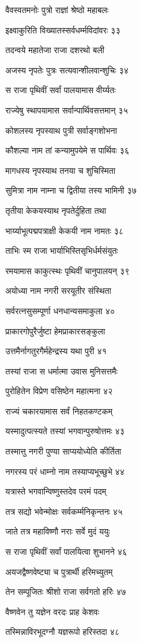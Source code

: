 वैवस्वतमनोः पुत्रो राज्ञां श्रेष्ठो महाबलः

इक्ष्वाकुरिति विख्यातस्सर्वधर्म्मविदांवरः ३३

तदन्वये महातेजा राजा दशरथो बली

अजस्य नृपतेः पुत्रः सत्यवान्शीलवान्शुचिः ३४

स राजा पृथिवीं सर्वां पालयामास वीर्य्यतः

राज्येषु स्थापयामास सर्वान्पार्थिवसत्तमान् ३५

कोशलस्य नृपस्याथ पुत्री सर्वाङ्गशोभना

कौशल्या नाम तां कन्यामुपयेमे स पार्थिवः ३६

मागधस्य नृपस्याथ तनया च शुचिस्मिता

सुमित्रा नाम नाम्ना च द्वितीया तस्य भामिनी ३७

तृतीया केकयस्याथ नृपतेर्दुहिता तथा

भार्य्याभूत्पद्मपत्राक्षी केकयी नाम नामतः ३८

ताभिः स्म राजा भार्याभिस्तिसृभिर्धर्मसंयुतः

रमयामास काकुत्स्थः पृथिवीं चानुपालयन् ३९

अयोध्या नाम नगरी सरयूतीर संस्थिता

सर्वरत्नसुसम्पूर्णा धनधान्यसमाकुला ४०

प्राकारगोपुरैर्जुष्टा हेमप्राकारसङ्कुला

उत्तमैर्नागतुरगैर्महेन्द्रस्य यथा पुरी ४१

तस्यां राजा स धर्मात्मा उवास मुनिसत्तमैः

पुरोहितेन विप्रेण वसिष्ठेन महात्मना ४२

राज्यं चकारयामास सर्वं निहतकण्टकम्

यस्मादुत्पत्स्यते तस्यां भगवान्पुरुषोत्तमः ४३

तस्मात्तु नगरी पुण्या साप्ययोध्येति कीर्तिता

नगरस्य परं धाम्नो नाम तस्याप्यभूच्छुभे ४४

यत्रास्ते भगवान्विष्णुस्तदेव परमं पदम्

तत्र सद्यो भवेन्मोक्षः सर्वकर्म्मनिकृन्तनः ४५

जाते तत्र महाविष्णौ नराः सर्वे मुदं ययुः

स राजा पृथिवीं सर्वां पालयित्वा शुभानने ४६

अयजद्वैष्णवेष्ट्या च पुत्रार्थी हरिमच्युतम्

तेन सम्पूजितः श्रीशो राजा सर्वगतो हरिः ४७

वैष्णवेन तु यज्ञेन वरदः प्राह केशवः

तस्मिन्नाविरभूदग्नौ यज्ञरूपो हरिस्तदा ४८


